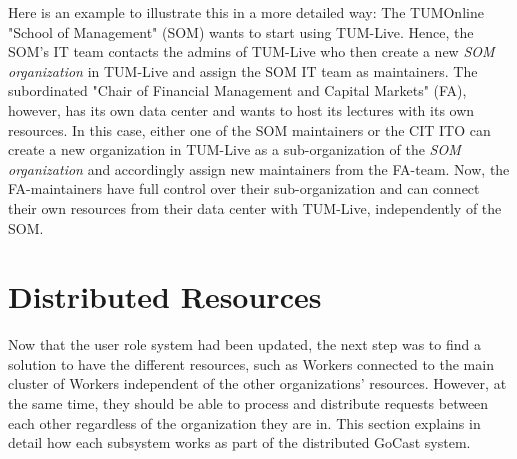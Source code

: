 Here is an example to illustrate this in a more detailed way:
The TUMOnline "School of Management" (SOM) wants to start using TUM-Live. Hence, the SOM's IT team contacts the admins of TUM-Live who then create a new \textit{SOM organization} in TUM-Live and assign the SOM IT team as maintainers.
The subordinated "Chair of Financial Management and Capital Markets" (FA), however, has its own data center and wants to host its lectures with its own resources. In this case, either one of the SOM maintainers or the \ac{CIT} \ac{ITO} can create a new organization in TUM-Live as a sub-organization of the \textit{SOM organization} and accordingly assign new maintainers from the FA-team. Now, the FA-maintainers have full control over their sub-organization and can connect their own resources from their data center with TUM-Live, independently of the SOM.











\section{Distributed Resources}

Now that the user role system had been updated, the next step was to find a solution to have the different resources, such as Workers connected to the main cluster of Workers independent of the other organizations' resources. However, at the same time, they should be able to process and distribute requests between each other regardless of the organization they are in. This section explains in detail how each subsystem works as part of the distributed GoCast system. 

